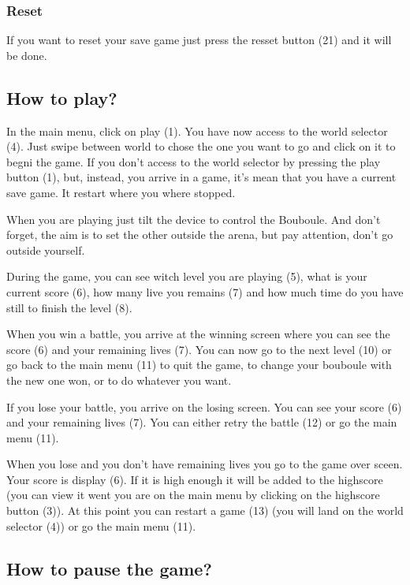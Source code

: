 \documentclass[a4paper,10pt]{report}
\begin{document}
		\subsubsection*{Reset}
		
If you want to reset your save game just press the resset button (21) and it will be done.

	\subsection*{How to play?}

In the main menu, click on play (1). You have now access to the world selector (4). Just swipe between world to chose the one you want to go and click on it to begni the game. If you don't access to the world selector by pressing the play button (1), but, instead, you arrive in a game, it's mean that you have a current save game. It restart where you where stopped.

When you are playing just tilt the device to control the Bouboule. And don't forget, the aim is to set the other outside the arena, but pay attention, don't go outside yourself.

During the game, you can see witch level you are playing (5), what is your current score (6), how many live you remains (7) and how much time do you have still to finish the level (8).

When you win a battle, you arrive at the winning screen where you can see the score (6) and your remaining lives (7). You can now go to the next level (10) or go back to the main menu (11) to quit the game, to change your bouboule with the new one won, or to do whatever you want.

If you lose your battle, you arrive on the losing screen. You can see your score (6) and your remaining lives (7). You can either retry the battle (12) or go the main menu (11).

When you lose and you don't have remaining lives you go to the game over sceen. Your score is display (6). If it is high enough it will be added to the highscore (you can view it went you are on the main menu by clicking on the highscore button (3)). At this point you can restart a game (13) (you will land on the world selector (4)) or go the main menu (11).

	\subsection*{How to pause the game?}
\end{document}
